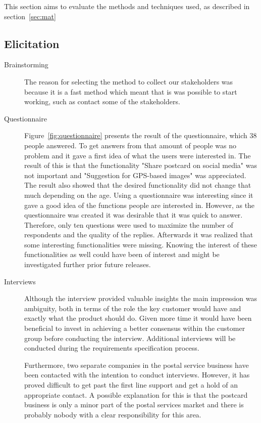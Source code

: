 \documentclass[10pt,a4paper]{article}
\begin{document}
This section aims to evaluate the methods and techniques used, as described in section~\ref{sec:mat}
\subsection{Elicitation}
\begin{description}
\item[Brainstorming]The reason for selecting the method to collect our stakeholders was because it is a fast method which meant that is was possible to start working, such as contact some of the stakeholders. 

\item[Questionnaire] Figure~\ref{fig:questionnaire} presents the result of the questionnaire, which 38 people answered. To get answers from that amount of people was no problem and it gave a first idea of what the users were interested in. The result of this is that the functionality "Share postcard on social media" was not important and "Suggestion for GPS-based images" was appreciated. The result also showed that the desired functionality did not change that much depending on the age. Using a questionnaire was interesting since it gave a good idea of the functions people are interested in. However, as the questionnaire  was created it was desirable that it was quick to answer. Therefore, only ten questions were used to maximize the number of respondents and the quality of the replies. Afterwards it was realized that some interesting functionalities were missing. Knowing the interest of these functionalities as well could have been of interest and might be investigated further prior future releases.

\item[Interviews] Although the interview provided valuable insights the main impression was ambiguity, both in terms of the role the key customer would have and exactly what the product should do. Given more time it would have been beneficial to invest in achieving a better consensus within the customer group before conducting the interview. Additional interviews will be conducted during the requirements specification process.

Furthermore, two separate companies in the postal service business have been contacted with the intention to conduct interviews. However, it has proved difficult to get past the first line support and get a hold of an appropriate contact. A possible explanation for this is that the postcard business is only a minor part of the postal services market and there is probably nobody with a clear responsibility for this area.  


\end{description}
\end{document}
